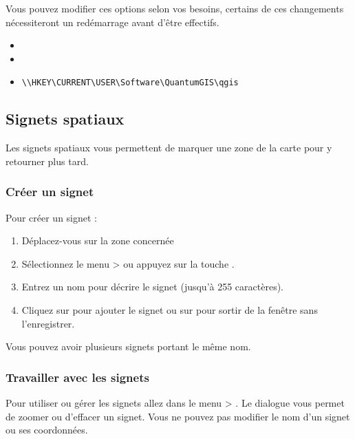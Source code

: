 \begin{itemize}
Vous pouvez modifier ces options selon vos besoins, certains de ces changements nécessiteront un redémarrage avant d'être effectifs.

\begin{itemize}
\item {}
\item {}
\item {}
\begin{verbatim}
\\HKEY\CURRENT\USER\Software\QuantumGIS\qgis
\end{verbatim}
\end{itemize}

\subsection{Signets spatiaux}\label{sec:bookmarks}

Les signets spatiaux vous permettent de marquer une zone de la carte pour y retourner plus tard.

\subsubsection{Créer un signet}
Pour créer un signet :
\begin{enumerate}
\item Déplacez-vous sur la zone concernée
\item Sélectionnez le menu  >  ou appuyez sur la touche .
\item Entrez un nom pour décrire le signet (jusqu'à 255 caractères).
\item Cliquez sur  pour ajouter le signet ou sur  pour sortir de la fenêtre sans l'enregistrer.
\end{enumerate}

Vous pouvez avoir plusieurs signets portant le même nom.

\subsubsection{Travailler avec les signets}
Pour utiliser ou gérer les signets allez dans le menu  > .
Le dialogue  vous permet de zoomer ou d'effacer un signet.
Vous ne pouvez pas modifier le nom d'un signet ou ses coordonnées.


\end{itemize}

